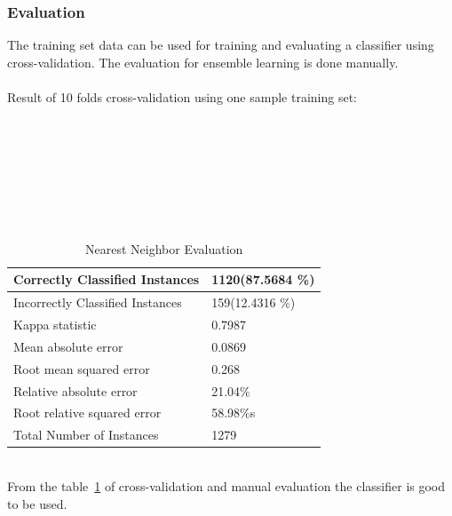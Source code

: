 \subsubsection*{Evaluation}
	The training set data can be used for training and evaluating a classifier using cross-validation. The evaluation for ensemble learning is done manually.\\\\
	Result of 10 folds cross-validation using one sample training set:\\\\\\\\\\\\\\\
\begin{table}
\centering
    \begin{tabular}{|l|l|} \hline
    Correctly Classified Instances   & 1120(87.5684 \%) \\ \hline
    Incorrectly Classified Instances & 159(12.4316 \%)  \\ \hline
    Kappa statistic                  & 0.7987          \\ \hline
    Mean absolute error              & 0.0869          \\ \hline
    Root mean squared error          & 0.268           \\ \hline
    Relative absolute error          & 21.04\%          \\ \hline
    Root relative squared error      & 58.98\%s          \\ \hline
    Total Number of Instances        & 1279            \\ \hline
    \end{tabular}
	\caption{Nearest Neighbor Evaluation\label{nn_table}}
\end{table}
	\\From the table~\ref{nn_table} of cross-validation and manual evaluation the classifier is good to be used.\\

	
	
	